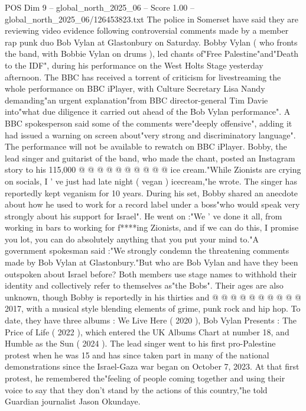 \begin{textsample}{POS Dim 9 – global\_north\_2025\_06 – Score 1.00 – global\_north\_2025\_06/126453823.txt}  \label{ex:f9_pos_378}
The police in Somerset have said they are reviewing video evidence following controversial comments made by a member rap punk duo Bob Vylan at Glastonbury on Saturday.
Bobby Vylan ( who fronts the band, with Bobbie Vylan on drums ), led chants of"Free Palestine"and"Death to the IDF", during his performance on the West Holts Stage yesterday afternoon.
The BBC has received a torrent of criticism for livestreaming the whole performance on BBC iPlayer, with Culture Secretary Lisa Nandy demanding"an urgent explanation"from BBC director-general Tim Davie into"what due diligence it carried out ahead of the Bob Vylan performance".
A BBC spokesperson said some of the comments were"deeply offensive", adding it had issued a warning on screen about"very strong and discriminatory language".
The performance will not be available to rewatch on BBC iPlayer.
Bobby, the lead singer and guitarist of the band, who made the chant, posted an Instagram story to his 115,000 @ @ @ @ @ @ @ @ @ @ ice cream."While Zionists are crying on socials, I ' ve just had late night ( vegan ) icecream,"he wrote.
The singer has reportedly kept veganism for 10 years.
During his set, Bobby shared an anecdote about how he used to work for a record label under a boss"who would speak very strongly about his support for Israel".
He went on :"We ' ve done it all, from working in bars to working for f****ing Zionists, and if we can do this, I promise you lot, you can do absolutely anything that you put your mind to."A government spokesman said :"We strongly condemn the threatening comments made by Bob Vylan at Glastonbury."But who are Bob Vylan and have they been outspoken about Israel before?
Both members use stage names to withhold their identity and collectively refer to themselves as"the Bobs".
Their ages are also unknown, though Bobby is reportedly in his thirties and @ @ @ @ @ @ @ @ @ @ 2017, with a musical style blending elements of grime, punk rock and hip hop.
To date, they have three albums : We Live Here ( 2020 ), Bob Vylan Presents : The Price of Life ( 2022 ), which entered the UK Albums Chart at number 18, and Humble as the Sun ( 2024 ).
The lead singer went to his first pro-Palestine protest when he was 15 and has since taken part in many of the national demonstrations since the Israel-Gaza war began on October 7, 2023.
At that first protest, he remembered the"feeling of people coming together and using their voice to say that they don't stand by the actions of this country,"he told Guardian journalist Jason Okundaye.

\end{textsample}

